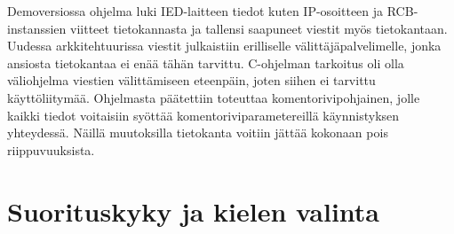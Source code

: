 Demoversiossa ohjelma luki IED-laitteen tiedot kuten IP-osoitteen ja RCB-instanssien viitteet tietokannasta ja tallensi saapuneet viestit myös tietokantaan. Uudessa arkkitehtuurissa viestit julkaistiin erilliselle välittäjäpalvelimelle, jonka ansiosta tietokantaa ei enää tähän tarvittu. C-ohjelman tarkoitus oli olla väliohjelma viestien välittämiseen eteenpäin, joten siihen ei tarvittu käyttöliitymää. Ohjelmasta päätettiin toteuttaa komentorivipohjainen, jolle kaikki tiedot voitaisiin syöttää komentoriviparametereillä käynnistyksen yhteydessä. Näillä muutoksilla tietokanta voitiin jättää kokonaan pois riippuvuuksista.


\section{Suorituskyky ja kielen valinta}
